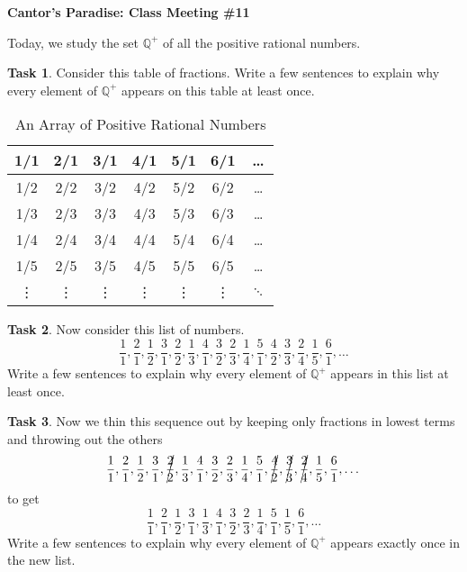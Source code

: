 \documentclass[12pt]{amsart}
\theoremstyle{definition}
\newtheorem{task}{Task}
\begin{document}
\begin{center}
\textbf{\Huge
Cantor's Paradise: Class Meeting \#11
}
\end{center}


\vspace{.5in}

Today, we study the set $\mathbb{Q}^+$ of all the positive rational numbers.

\begin{task}
Consider this table of fractions. Write a few sentences to explain why every element of $\mathbb{Q}^+$ appears on this table at least once.
\begin{table}[htdp]
\begin{center}
\begin{tabular}{|c|c|c|c|c|c|c|}
\hline
1/1 & 2/1 & 3/1 & 4/1& 5/1 & 6/1& \dots \\
\hline
1/2 & 2/2 & 3/2 & 4/2 & 5/2 & 6/2& \dots \\
\hline
1/3 & 2/3 & 3/3 & 4/3 & 5/3 & 6/3& \dots \\
\hline
1/4 & 2/4 & 3/4 & 4/4 & 5/4 & 6/4& \dots \\
\hline
1/5 & 2/5 & 3/5 & 4/5 & 5/5 & 6/5& \dots \\
\hline
\vdots & \vdots & \vdots & \vdots & \vdots & \vdots & $\ddots$ \\
\hline
\end{tabular}
\end{center}
\label{default}
\caption{An Array of Positive Rational Numbers}
\end{table}%
\end{task}

\vspace{2in}

\begin{task} Now consider this list of numbers.
\[
\frac{1}{1}, \frac{2}{1}, \frac{1}{2}, \frac{3}{1}, \frac{2}{2}, \frac{1}{3}, \frac{4}{1}, \frac{3}{2}, \frac{2}{3}, \frac{1}{4}, \frac{5}{1}, \frac{4}{2}, \frac{3}{3}, \frac{2}{4}, \frac{1}{5}, \frac{6}{1}, \dots
\]
Write a few sentences to explain why every element of $\mathbb{Q}^+$ appears in this list at least once.\\
\end{task}

\clearpage

\begin{task}
Now we thin this sequence out by keeping only fractions in lowest terms and throwing out the others
\[
\frac{1}{1}, \frac{2}{1}, \frac{1}{2}, \frac{3}{1}, \cancel{\frac{2}{2}}, \frac{1}{3}, \frac{4}{1}, \frac{3}{2}, \frac{2}{3}, \frac{1}{4}, \frac{5}{1}, \cancel{\frac{4}{2}}, \cancel{\frac{3}{3}}, \cancel{\frac{2}{4}}, \frac{1}{5}, \frac{6}{1}, \dots
\]
to get
\[
\frac{1}{1}, \frac{2}{1}, \frac{1}{2}, \frac{3}{1}, \frac{1}{3}, \frac{4}{1}, \frac{3}{2}, \frac{2}{3}, \frac{1}{4}, \frac{5}{1}, \frac{1}{5}, \frac{6}{1}, \dots
\]
Write a few sentences to explain why every element of $\mathbb{Q}^+$ appears exactly once in the new list.\\
\end{task}
\end{document}
